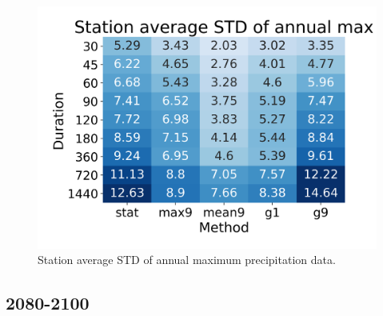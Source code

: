 \begin{figure}[hbt!]
    \centering
    \includegraphics[scale=0.4]{figures/AM_station_avg_std.png}
    \caption{Station average STD of annual maximum precipitation data.}
    \label{fig:AM_stat}
\end{figure}


\subsection{2080-2100}
